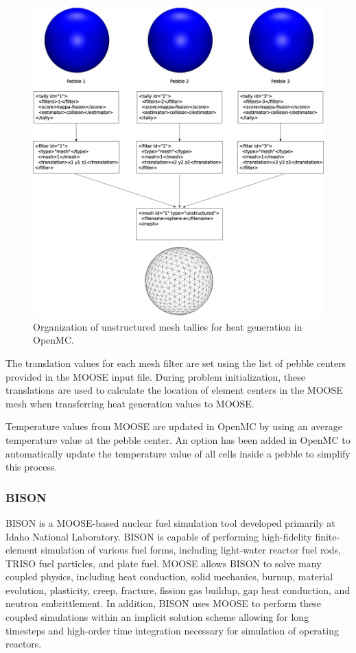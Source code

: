 \begin{figure}[ht]
    \centering
    \includegraphics[width=\textwidth]{Figures/umesh_tally_diagram}
    \caption{Organization of unstructured mesh tallies for heat generation in OpenMC.}
    \label{fig:umesh_tally_steup}
\end{figure}

The translation values for each mesh filter are set using the list of pebble centers provided in the MOOSE input file. During problem initialization, these translations are used to calculate the location of element centers in the MOOSE mesh when transferring heat generation values to MOOSE.

Temperature values from MOOSE are updated in OpenMC by using an average temperature value at the pebble center. An option has been added in OpenMC to automatically update the temperature value of all cells inside a pebble to simplify this process.

\subsubsection{BISON}

BISON is a MOOSE-based \cite{hales2013triso, williamson2012multidimensional} nuclear fuel simulation tool developed primarily at Idaho National Laboratory.
BISON is capable of performing high-fidelity finite-element simulation of various fuel forms, including
light-water reactor fuel rods, TRISO fuel particles, and plate fuel. MOOSE allows BISON to solve many
coupled physics, including heat conduction, solid mechanics, burnup, material evolution, plasticity, creep,
fracture, fission gas buildup, gap heat conduction, and neutron embrittlement. In addition, BISON uses
MOOSE to perform these coupled simulations within an implicit solution scheme allowing for long timesteps
and high-order time integration necessary for simulation of operating reactors.


